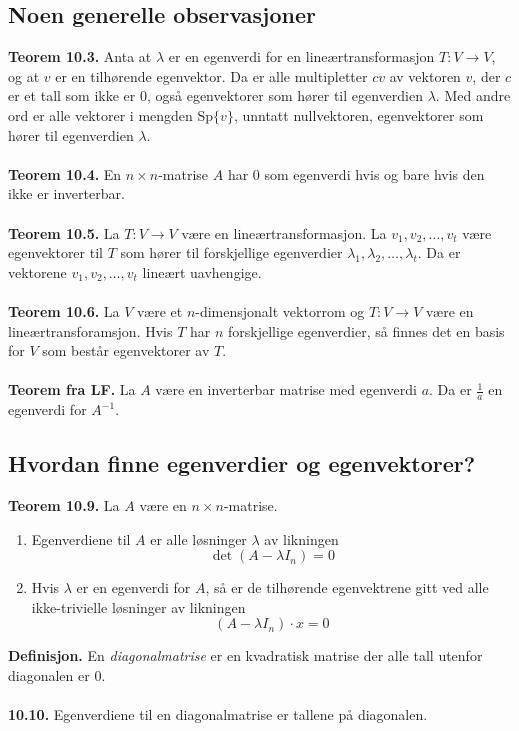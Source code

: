 \documentclass{article}
\begin{document}
\subsection{Noen generelle observasjoner}
\textbf{Teorem 10.3.} Anta at $\lambda$ er en egenverdi for en lineærtransformasjon $T: V \rightarrow V$, og at $v$ er en tilhørende egenvektor. Da er alle multipletter $cv$ av vektoren $v$, der $c$ er et tall som ikke er $0$, også egenvektorer som hører til egenverdien $\lambda$. Med andre ord er alle vektorer i mengden $\text{Sp}\{v\}$, unntatt nullvektoren, egenvektorer som hører til egenverdien $\lambda$.
\\\\
\textbf{Teorem 10.4.} En $n \times n$-matrise $A$ har $0$ som egenverdi hvis og bare hvis den ikke er inverterbar.
\\\\
\textbf{Teorem 10.5.} La $T: V \rightarrow V$ være en lineærtransformasjon. La $v_1, v_2, \dots, v_t$ være egenvektorer til $T$ som hører til forskjellige egenverdier $\lambda_1, \lambda_2, \dots, \lambda_t$. Da er vektorene $v_1, v_2, \dots, v_t$ lineært uavhengige.
\\\\
\textbf{Teorem 10.6.} La $V$ være et $n$-dimensjonalt vektorrom og $T: V \rightarrow V$ være en lineærtransforamsjon. Hvis $T$ har $n$ forskjellige egenverdier, så finnes det en basis for $V$ som består egenvektorer av $T$.
\\\\
\textbf{Teorem fra LF.} La $A$ være en inverterbar matrise med egenverdi $a$. Da er $\frac{1}{a}$ en egenverdi for $A^{-1}$.


\subsection{Hvordan finne egenverdier og egenvektorer?}
\textbf{Teorem 10.9.} La $A$ være en $n \times n$-matrise.
\begin{enumerate}
    \item Egenverdiene til $A$ er alle løsninger $\lambda$ av likningen
    \[ \det{(A - \lambda I_n)} = 0 \]
    \item Hvis $\lambda$ er en egenverdi for $A$, så er de tilhørende egenvektrene gitt ved alle ikke-trivielle løsninger av likningen
    \[ (A - \lambda I_n ) \cdot x = 0 \]
\end{enumerate} 
\textbf{Definisjon.} En \textit{diagonalmatrise} er en kvadratisk matrise der alle tall utenfor diagonalen er $0$.
\\\\
\textbf{10.10.} Egenverdiene til en diagonalmatrise er tallene på diagonalen.
\end{document}
